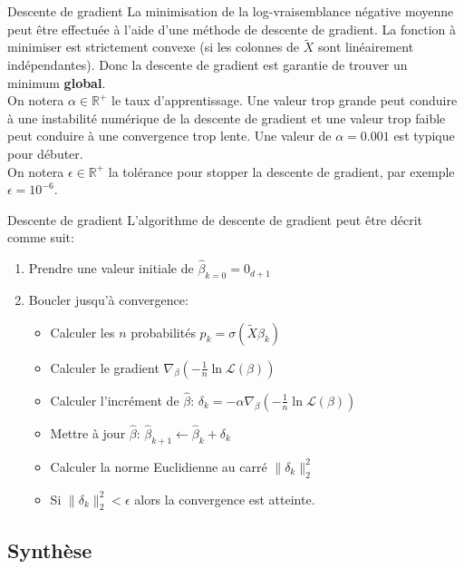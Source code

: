 \documentclass[10pt]{beamer}  %
\begin{document}
\begin{frame}{Descente de gradient}
	La minimisation de la log-vraisemblance négative moyenne peut être effectuée à l'aide d'une méthode de descente de gradient. La fonction à minimiser est strictement convexe (si les colonnes de $\tilde{X}$ sont linéairement indépendantes). Donc la descente de gradient est garantie de trouver un minimum \textbf{global}. \\
	\vspace{0.5cm}
	On notera $\alpha \in \mathbb{R}^+$ le taux d'apprentissage. Une valeur trop grande peut conduire à une instabilité numérique de la descente de gradient et une valeur trop faible peut conduire à une convergence trop lente. Une valeur de $\alpha = 0.001$ est typique pour débuter. \\
	\vspace{0.5cm}
	On notera $\epsilon \in \mathbb{R}^+$ la tolérance pour stopper la descente de gradient, par exemple $\epsilon = 10^{-6}$.
\end{frame}

\begin{frame}{Descente de gradient}
	L'algorithme de descente de gradient peut être décrit comme suit:
	\begin{enumerate}
		\item Prendre une valeur initiale de $\hat{\beta}_{k=0} = 0_{d+1}$
		\item Boucler jusqu'à convergence:
		\begin{itemize}
			\item Calculer les $n$ probabilités $p_k = \sigma(\tilde{X} \beta_{k})$
			\item Calculer le gradient $\nabla_{\beta}\left(- \frac{1}{n} \ln{\mathcal{L}(\beta)}\right)$
			\item Calculer l'incrément de $\hat{\beta}$: $\delta_k = - \alpha \nabla_{\beta}\left(- \frac{1}{n} \ln{\mathcal{L}(\beta)}\right)$
			\item Mettre à jour $\hat{\beta}$: $\hat{\beta}_{k+1} \leftarrow \hat{\beta}_{k} + \delta_k$
			\item Calculer la norme Euclidienne au carré $\|\delta_k \|_2^2$
			\item Si $\|\delta_k \|_2^2 < \epsilon$ alors la convergence est atteinte.
		\end{itemize}
	\end{enumerate}
\end{frame}

\subsection[Synthèse]{Synthèse}
\end{document}
